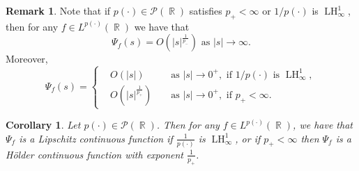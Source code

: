 \documentclass[11pt,reqno]{amsart}
\newtheorem{corollary}[theorem]{Corollary}
\theoremstyle{definition}
\theoremstyle{definition}
\newtheorem{obs}{Remark}
\theoremstyle{definition}
\DeclareMathOperator{\R}{\mathbb{R}}
\newcommand{\p}{p(\cdot)}
\newcommand{\Lp}{L^{\p}(\R)}
\newcommand{\LH}{\operatorname{LH}_\infty^1}
\begin{document}
\begin{obs}\label{remark_asympt}
    Note that if $\p\in\mathcal{P}(\R)$ satisfies $p_{+}<\infty$ or  $1/\p$ is $\LH$, then for any $f\in \Lp$ we have that
    \begin{equation*}
        \Psi_f(s) = O\left(|s|^{\frac{1}{p_{-}}}\right)\text{ as } |s|\to \infty.
    \end{equation*}
    Moreover,
    \begin{equation*}
        \Psi_f(s)=\left\{\begin{alignedat}{3}
      &O(|s|) &&\text{ as } |s|\to 0^+, \text{ if $1/\p$ is $\LH$},\\
      &O\left(|s|^{\frac{1}{p_{+}}}\right) &&\text{ as } |s|\to 0^+, \text{ if }p_{+}<\infty.
        \end{alignedat}\right.
    \end{equation*}
\end{obs}
\begin{corollary}
    Let $\p\in \mathcal{P}(\R)$. Then for any $f\in L^{p(\cdot)}(\R)$, we have that $\Psi_f$ is a Lipschitz continuous function if $\frac{1}{\p
    }$ is $\LH$, or if $p_+<\infty$ then $\Psi_f$ is a Hölder continuous function with exponent $\frac{1}{p_{+}}$.
\end{corollary}
\end{document}
